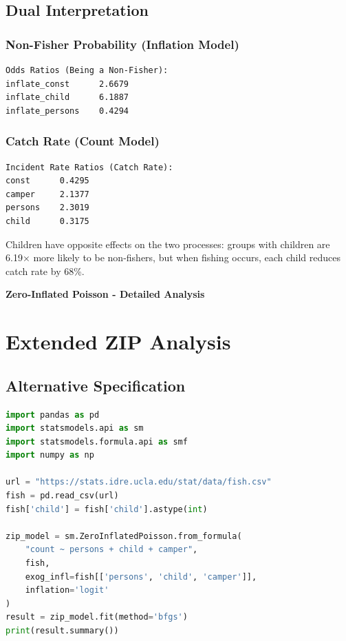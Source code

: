 \documentclass[12pt, a4paper]{article}
\newcounter{problemcounter}
\newcommand{\problemtitle}[1]{%
    \vspace{1cm}
    \begin{tcolorbox}[
        colback=DeepForest!5,
        colframe=DeepForest,
        arc=15pt,
        boxrule=1.2pt,
        left=20pt,
        right=20pt,
        top=12pt,
        bottom=12pt,
        enhanced,
        attach boxed title to top center={yshift=-8pt},
        boxed title style={
            colback=AmberSunset,
            colframe=DeepForest,
            arc=10pt,
            outer arc=10pt,
            boxrule=0.8pt,
            sharp corners,
            },
        title={\color{white}\large\sffamily\bfseries \faTasks \quad PROBLEM \arabic{problemcounter}}
    ]
        \centering
        {\color{DeepForest}\Large\bfseries\sffamily #1}
    \end{tcolorbox}
    \stepcounter{problemcounter}
    \vspace{0.3cm}
}
\begin{document}
\subsection*{Dual Interpretation}

\subsubsection*{Non-Fisher Probability (Inflation Model)}
\begin{outputbox}
\begin{verbatim}
Odds Ratios (Being a Non-Fisher):
inflate_const      2.6679
inflate_child      6.1887
inflate_persons    0.4294
\end{verbatim}
\end{outputbox}

\subsubsection*{Catch Rate (Count Model)}
\begin{outputbox}
\begin{verbatim}
Incident Rate Ratios (Catch Rate):
const      0.4295
camper     2.1377
persons    2.3019
child      0.3175
\end{verbatim}
\end{outputbox}

\begin{insightbox}
Children have opposite effects on the two processes: groups with children are 6.19× more likely to be non-fishers, but when fishing occurs, each child reduces catch rate by 68\%.
\end{insightbox}

\newpage

\problemtitle{Zero-Inflated Poisson - Detailed Analysis}

\section*{Extended ZIP Analysis}

\subsection*{Alternative Specification}

\begin{lstlisting}[language=Python]
import pandas as pd
import statsmodels.api as sm
import statsmodels.formula.api as smf
import numpy as np

url = "https://stats.idre.ucla.edu/stat/data/fish.csv"
fish = pd.read_csv(url)
fish['child'] = fish['child'].astype(int)

zip_model = sm.ZeroInflatedPoisson.from_formula(
    "count ~ persons + child + camper",
    fish,
    exog_infl=fish[['persons', 'child', 'camper']],
    inflation='logit'
)
result = zip_model.fit(method='bfgs')
print(result.summary())
\end{lstlisting}
\end{document}
